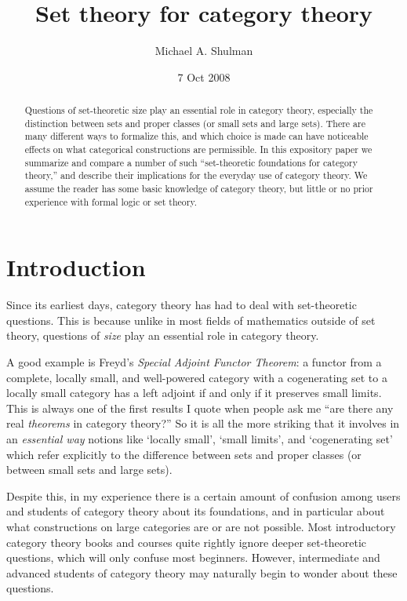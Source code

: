 \documentclass[12pt]{amsart}
\title{Set theory for category theory}
\author{Michael A. Shulman}
\date{7 Oct 2008}
\begin{document}
\maketitle

\begin{abstract}
  Questions of set-theoretic size play an essential role in category
  theory, especially the distinction between sets and proper classes
  (or small sets and large sets).  There are many different ways to
  formalize this, and which choice is made can have noticeable effects
  on what categorical constructions are permissible.  In this
  expository paper we summarize and compare a number of such
  ``set-theoretic foundations for category theory,'' and describe their
  implications for the everyday use of category theory.  We assume the
  reader has some basic knowledge of category theory, but little or no
  prior experience with formal logic or set theory.
\end{abstract}

\section{Introduction}
\label{sec:introduction}

Since its earliest days, category theory has had to deal with
set-theoretic questions.  This is because unlike in most fields of
mathematics outside of set theory, questions of \emph{size} play an
essential role in category theory.

A good example is Freyd's \emph{Special Adjoint Functor Theorem}: a
functor from a complete, locally small, and well-powered category with
a cogenerating set to a locally small category has a left adjoint if
and only if it preserves small limits.  This is always one of the
first results I quote when people ask me ``are there any real
\emph{theorems} in category theory?''  So it is all the more striking
that it involves in an \emph{essential way} notions like `locally
small', `small limits', and `cogenerating set' which refer explicitly
to the difference between sets and proper classes (or between small
sets and large sets).

Despite this, in my experience there is a certain amount of confusion
among users and students of category theory about its foundations, and
in particular about what constructions on large categories are or are
not possible.  Most introductory category theory books and courses
quite rightly ignore deeper set-theoretic questions, which will only
confuse most beginners.  However, intermediate and advanced students
of category theory may naturally begin to wonder about these
questions.
\end{document}

